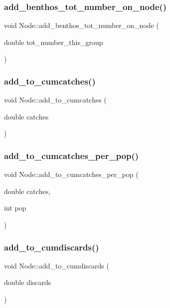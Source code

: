 \subsubsection{\texorpdfstring{add\_benthos\_tot\_number\_on\_node()}{add\_benthos\_tot\_number\_on\_node()}}
{\footnotesize\ttfamily void Node\+::add\+\_\+benthos\+\_\+tot\+\_\+number\+\_\+on\+\_\+node (\begin{DoxyParamCaption}\item[{double}]{tot\+\_\+number\+\_\+this\+\_\+group }\end{DoxyParamCaption})}

\mbox{\label{class_node_acdf79413c8c5ec3a10e3f7f0a3dcc6c3}} 
\subsubsection{\texorpdfstring{add\_to\_cumcatches()}{add\_to\_cumcatches()}}
{\footnotesize\ttfamily void Node\+::add\+\_\+to\+\_\+cumcatches (\begin{DoxyParamCaption}\item[{double}]{catches }\end{DoxyParamCaption})}

\mbox{\label{class_node_a4e48667023f2c73bb363898c9a508292}} 
\subsubsection{\texorpdfstring{add\_to\_cumcatches\_per\_pop()}{add\_to\_cumcatches\_per\_pop()}}
{\footnotesize\ttfamily void Node\+::add\+\_\+to\+\_\+cumcatches\+\_\+per\+\_\+pop (\begin{DoxyParamCaption}\item[{double}]{catches,  }\item[{int}]{pop }\end{DoxyParamCaption})}

\mbox{\label{class_node_a2b0502c38e35ceebb3d66369f9c1108b}} 
\subsubsection{\texorpdfstring{add\_to\_cumdiscards()}{add\_to\_cumdiscards()}}
{\footnotesize\ttfamily void Node\+::add\+\_\+to\+\_\+cumdiscards (\begin{DoxyParamCaption}\item[{double}]{discards }\end{DoxyParamCaption})}

